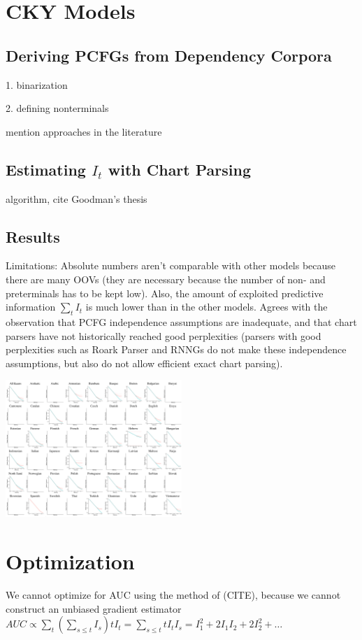 \documentclass[11pt,letterpaper]{article}
\begin{document}
\section{CKY Models}
\subsection{Deriving PCFGs from Dependency Corpora}
1. binarization

2. defining nonterminals

mention approaches in the literature
\subsection{Estimating $I_t$ with Chart Parsing}
algorithm, cite Goodman's thesis
\subsection{Results}
Limitations: Absolute numbers aren't comparable with other models because there are many OOVs (they are necessary because the number of non- and preterminals has to be kept low).
Also, the amount of exploited predictive information $\sum_t I_t$ is much lower than in the other models. Agrees with the observation that PCFG independence assumptions are inadequate, and that chart parsers have not historically reached good perplexities (parsers with good perplexities such as Roark Parser and RNNGs do not make these independence assumptions, but also do not allow efficient exact chart parsing).

\begin{center}
\includegraphics[width=0.5\textwidth]{results-table-pcfg.pdf}
\label{fig:resu-pcfg}
\end{center}



\section{Optimization}
We cannot optimize for AUC using the method of (CITE), because we cannot construct an unbiased gradient estimator
$AUC \propto \sum_{t} (\sum_{s \leq t} I_s) tI_t = \sum_{s \leq t}  tI_t I_s = I_1^2 + 2 I_1 I_2 + 2 I_2^2 + \dots$
\end{document}
